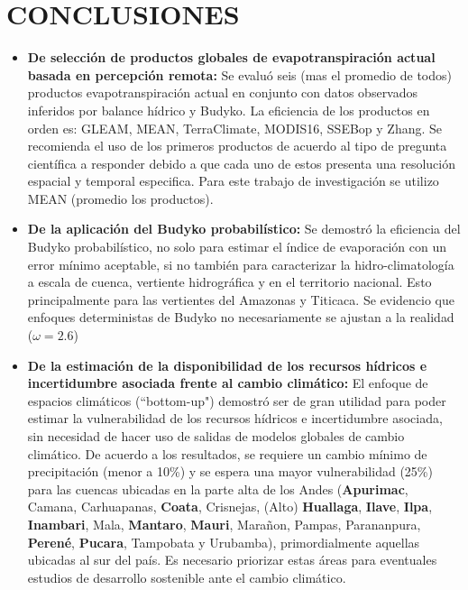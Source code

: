 \documentclass[12pt]{article}
\begin{document}


\clearpage
\vspace*{0.5mm}
\section{CONCLUSIONES}

\begin{itemize}
    \item \textbf{De selección de productos globales de evapotranspiración actual basada en percepción remota:} Se evaluó seis (mas el promedio de todos) productos evapotranspiración actual en conjunto con datos observados inferidos por balance hídrico y Budyko. La eficiencia de los productos en orden es: GLEAM, MEAN, TerraClimate, MODIS16, SSEBop y Zhang. Se recomienda el uso de los primeros productos de acuerdo al tipo de pregunta científica a responder debido a que cada uno de estos presenta una resolución espacial y temporal especifica. Para este trabajo de investigación se utilizo MEAN (promedio los productos).
   
    \item \textbf{De la aplicación del Budyko probabilístico:}
    Se demostró la eficiencia del Budyko probabilístico, no solo para estimar el índice de evaporación con un error mínimo aceptable, si no también para caracterizar la hidro-climatología a escala de cuenca, vertiente hidrográfica y en el territorio nacional. Esto principalmente para las vertientes del Amazonas y Titicaca. Se evidencio que enfoques deterministas de Budyko no necesariamente se ajustan a la realidad ($\omega = 2.6$)
    
    \item \textbf{De la estimación de la disponibilidad de los recursos hídricos e incertidumbre asociada frente al cambio climático:} El enfoque de espacios climáticos (“bottom-up") demostró ser de gran utilidad para poder estimar la vulnerabilidad de los recursos hídricos e incertidumbre asociada, sin necesidad de hacer uso de salidas de modelos globales de cambio climático. De acuerdo a los resultados, se requiere un cambio mínimo de precipitación (menor a 10\%) y se espera una mayor vulnerabilidad (25\%) para las cuencas ubicadas en la parte alta de los Andes (\textbf{Apurimac}, Camana, Carhuapanas, \textbf{Coata}, Crisnejas, (Alto) \textbf{Huallaga}, \textbf{Ilave}, \textbf{Ilpa}, \textbf{Inambari}, Mala, \textbf{Mantaro}, \textbf{Mauri}, Marañon, Pampas, Parananpura, \textbf{Perené}, \textbf{Pucara}, Tampobata y Urubamba), primordialmente aquellas ubicadas al sur del país. Es necesario priorizar estas áreas para eventuales estudios de desarrollo sostenible ante el cambio climático.
    
\end{itemize}
\end{document}
